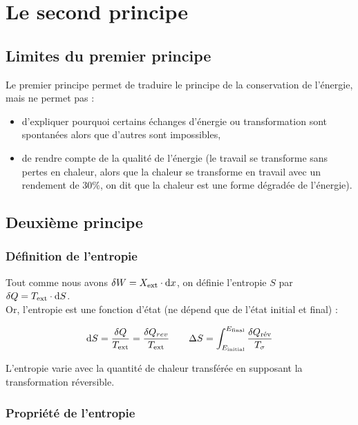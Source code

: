 \documentclass[13pt, twoside, a4paper, french]{report}
\begin{document}
\chapter{Le second principe}


    \section{Limites du premier principe}

        Le premier principe permet de traduire le principe de la conservation de l'énergie, mais ne permet pas :
        \begin{itemize}
            \item d'expliquer pourquoi certains échanges d'énergie ou transformation sont spontanées alors que d'autres sont impossibles,
            \item de rendre compte de la qualité de l'énergie (le travail se transforme sans pertes en chaleur, alors que la chaleur se transforme en travail avec un rendement de $30\%$, on dit que la chaleur est une forme dégradée de l'énergie).
        \end{itemize}


    \section{Deuxième principe}

        \subsection{Définition de l'entropie}

            Tout comme nous avons $\delta W = X_\textrm{ext} \cdot \textrm d x$, on définie l'entropie $S$ par $\delta Q = T_\textrm{ext} \cdot \textrm d S$.\\
            Or, l'entropie est une fonction d'état (ne dépend que de l'état initial et final) :

            \[\textrm d S = \dfrac{\delta Q}{T_\textrm{ext}} = \dfrac{\delta Q_{rev}}{T_\textrm{ext}} \qquad \Delta S = \int_{E_\textrm{initial}}^{E_\textrm{final}} \dfrac{\delta Q_\textrm{rév}}{T_\sigma}\]

            L'entropie varie avec la quantité de chaleur transférée en supposant la transformation réversible.

        \subsection{Propriété de l’entropie}
\end{document}

